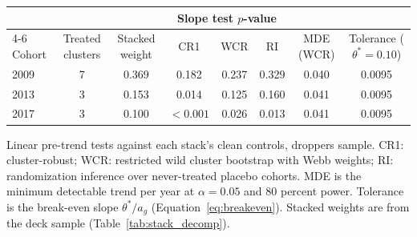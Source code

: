 \begin{tabular}{lccccccc}
\toprule
& & & \multicolumn{3}{c}{Slope test $p$-value} & & \\
\cmidrule(lr){4-6}
Cohort & Treated clusters & Stacked weight & CR1 & WCR & RI & MDE (WCR) & Tolerance ($\theta^{*}{=}0.10$) \\
\midrule
2009 & 7 & 0.369 & 0.182 & 0.237 & 0.329 & 0.040 & 0.0095 \\
2013 & 3 & 0.153 & 0.014 & 0.125 & 0.160 & 0.041 & 0.0095 \\
2017 & 3 & 0.100 & $<0.001$ & 0.026 & 0.013 & 0.041 & 0.0095 \\
\bottomrule
\end{tabular}

\smallskip
{\footnotesize \noindent Linear pre-trend tests against each stack's clean controls, droppers sample. CR1: cluster-robust; WCR: restricted wild cluster bootstrap with Webb weights; RI: randomization inference over never-treated placebo cohorts. MDE is the minimum detectable trend per year at $\alpha = 0.05$ and 80 percent power. Tolerance is the break-even slope $\theta^{*}/a_g$ (Equation~\ref{eq:breakeven}). Stacked weights are from the deck sample (Table~\ref{tab:stack_decomp}).\par}
